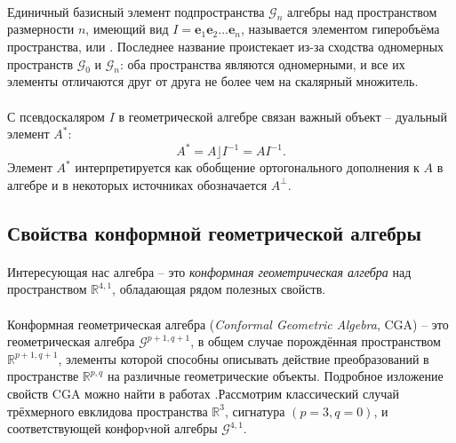 \documentclass[12pt]{article}
\begin{document}
\paragraph{}
Единичный базисный элемент подпространства $\mathcal{G}_n$ алгебры над пространством размерности $n$, имеющий вид $I = \mathbf{e}_1\mathbf{e}_2\dots \mathbf{e}_n$, называется элементом гиперобъёма пространства, или . Последнее название проистекает из-за сходства одномерных пространств $\mathcal{G}_0$ и $\mathcal{G}_n$: оба пространства являются одномерными, и все их элементы отличаются друг от друга не более чем на скалярный множитель.
\paragraph{}
С псевдоскаляром $I$ в геометрической алгебре связан важный объект -- дуальный элемент $A^*$:
$$ A^* = A \rfloor I^{-1} = AI^{-1}.$$
Элемент $A^*$ интерпретируется как обобщение ортогонального дополнения к $A$ в алгебре и в некоторых источниках обозначается $A^\bot$.

\newpage
\subsection{Свойства конформной геометрической алгебры}
\paragraph{} Интересующая нас алгебра -- это \textit{конформная геометрическая алгебра} над пространством $\mathds{R}^{4,1}$, обладающая рядом полезных свойств.

\paragraph{}
Конформная геометрическая алгебра (\textit{Conformal Geometric Algebra}, CGA) -- это геометрическая алгебра $\mathcal{G}^{p+1,q+1}$, в общем случае порождённая пространством $\mathds{R}^{p+1, q+1}$, элементы которой способны описывать действие преобразований в пространстве $\mathds{R}^{p, q}$ на различные геометрические объекты. Подробное изложение свойств CGA можно найти в работах \cite{Miller2013GeometricAA, Cliff, Sommer2001GeometricCW}.Рассмотрим классический случай трёхмерного евклидова пространства $\mathds{R}^3$, сигнатура $(p=3,q=0)$, и соответствующей конфорvной алгебры $\mathcal{G}^{4,1}$.
\end{document}
